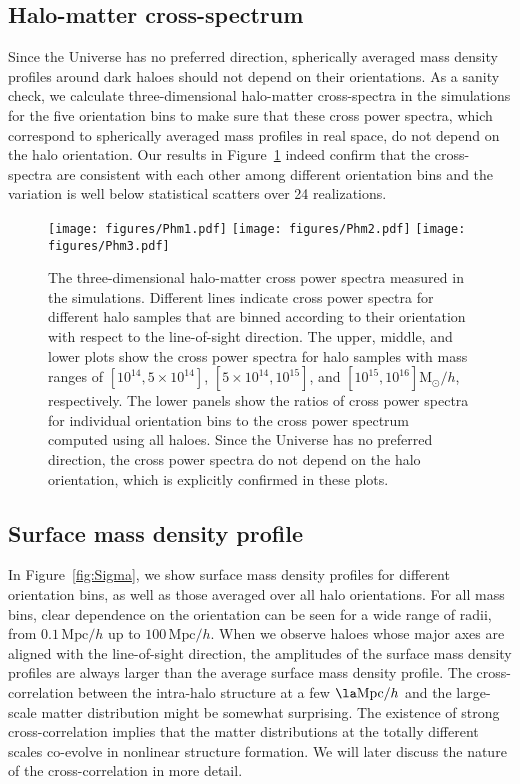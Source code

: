 \documentclass[a4paper,fleqn,usenatbib]{mnras}
\newcommand{\Mpc}{\mathrm{Mpc}}
\newcommand{\Msun}{\mathrm{M}_\odot}
\begin{document}
\subsection{Halo-matter cross-spectrum}
Since the Universe has no preferred direction, spherically averaged
mass density profiles around dark haloes should not depend on their
orientations. As a sanity check, we calculate three-dimensional
halo-matter cross-spectra in the simulations for the five orientation
bins to make sure that these cross power spectra, which correspond to
spherically averaged mass profiles in real space, do not depend on
the halo orientation. Our results in Figure~\ref{fig:Phm} indeed
confirm that the cross-spectra are consistent with each other among
different orientation bins and the variation is well
below statistical scatters over 24 realizations.

\begin{figure}
\texttt{[image: figures/Phm1.pdf]}
\texttt{[image: figures/Phm2.pdf]}
\texttt{[image: figures/Phm3.pdf]}
\caption{The three-dimensional halo-matter cross power spectra measured in
  the simulations. Different lines indicate cross power spectra for
  different halo samples that are binned according to their
  orientation with respect to the line-of-sight direction. The upper,
  middle, and lower plots show the cross power spectra for halo samples with
  mass ranges of $[10^{14}, 5 \times 10^{14}]$, $[5 \times 10^{14}, 10^{15}]$,
  and $[10^{15}, 10^{16}] \Msun /h$, respectively.
  The lower panels show the ratios of cross power spectra for
  individual orientation bins to the cross power spectrum computed
  using all haloes. Since the Universe has no preferred direction, the
  cross power spectra do not depend on the halo orientation, which is
  explicitly confirmed in these plots.}
\label{fig:Phm}
\end{figure}

\subsection{Surface mass density profile}
In Figure~\ref{fig:Sigma}, we show surface mass density profiles for
different orientation bins, as well as those averaged over all halo
orientations. For all mass bins, clear dependence on the orientation
can be seen for a wide range of radii, from $0.1\,\Mpc/h$ up to
$100\,\Mpc/h$. When we observe haloes whose major axes are aligned
with the line-of-sight direction, the amplitudes of the surface mass
density profiles are always larger than the average surface mass
density profile.
The cross-correlation between the intra-halo structure
at a few $\la \Mpc/h$ and the large-scale matter
distribution might be somewhat surprising.
The existence of strong cross-correlation implies
that the matter distributions at the totally different scales
co-evolve in nonlinear structure formation. We will later discuss the nature of
the cross-correlation in more detail.
\end{document}
